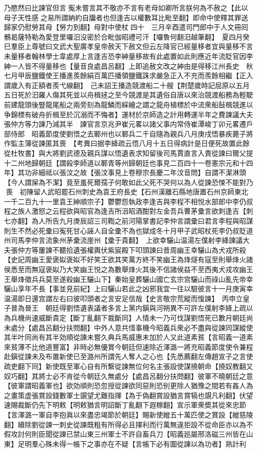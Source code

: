 乃愍然曰比諫官但言寃未嘗言其不敬亦不言有老母如卿所言朕何為不赦之【此以母子天性感之易所謂納約自牖者也但逢吉以權數耳比毗至翻】即命中使釋其罪送歸家仍慰勞其母【勞力到翻】母對中使杖四十　三月辛酉遣司門郎中于人文冊囘鶻曷薩特勒為愛登里囉汨没密於合毗伽昭禮可汗【囉魯何翻汨越筆翻】　夏四月癸巳羣臣上尊號曰文武大聖廣孝皇帝赦天下赦文但云左降官已經量移者宜與量移不言未量移者翰林學士韋處厚上言逢吉恐李紳量移故有此處置如此則應近年流貶官因李紳一人皆不得量移也【量音良處昌呂翻】上即追赦文改之紳由是得移江州長史　秋七月甲辰鹽鐵使王播進羨餘絹百萬匹播領鹽鐵誅求嚴急正入不充而羨餘相繼【正入謂歲入有正額者羨弋線翻】　己未詔王播造競渡船二十艘【荆楚歲時記屈原以五月五日死於汨羅人傷其死並以舟楫拯之至今競渡是其遺俗自唐以來治競渡船務為輕駛前建龍頭後豎龍尾船之兩旁刻為龍鱗而綵繪之謂之龍舟植標於中流衆船鼔楫競進以争錦標有破舟折楫至於沉溺而不悔者】運材於京師造之計用轉運半年之費諫議大夫張仲方等力諫乃減其半　諫官言京兆尹崔元畧以諸父事内常侍崔潭峻丁卯元畧遷戶部侍郎　昭義節度使劉悟之去鄆州也以鄆兵二千自隨為親兵八月庚戌悟暴疾薨子將作監主簿從諫匿其喪　【考異曰据李絳疏云悟八月十五日得病計是日便死故置此餘從杜牧書】與大將劉武德及親兵謀以悟遺表求知留後司馬賈直言入責從諫曰爾父提十二州地歸朝廷【謂殺李師道以鄆青等州歸朝廷也事見二百四十一卷憲宗元和十四年】其功非細祗以張汶之故【張汶事見上卷穆宗長慶二年汶音問】自謂不潔淋頭【今人謂屎為不潔】竟至羞死爾孺子何敢如此父死不哭何以為人從諫恐悚不能對乃喪　初陳留人武昭罷石州刺史為袁王府長史【石州漢離石縣地唐置石州京師東北一千二百九十一里袁王紳順宗子】鬱鬱怨執政李逢吉與李程不相悦水部郎中李仍叔程之族人激怒之云程欲與昭官為逢吉所沮昭酒酣對左金吾兵曹茅彚言欲刺逢吉【刺七亦翻】為人所告九月庚辰詔三司鞫之前河陽掌書記李仲言謂彚曰君言李程與昭謀則生不然必死彚曰寃死甘心誣人自全彚不為也獄成冬十月甲子武昭杖死李仍叔貶道州司馬李仲言流象州茅彚流崖州【彚于貴翻】　上欲幸驪山温湯左僕射李絳諫議大夫張仲方等屢諫不聽拾遺張權輿伏紫宸殿下叩頭諫曰昔周幽王幸驪山為犬戎所殺【史記周幽王愛褒姒褒姒不好笑王欲其笑萬方終不笑幽王為烽燧有寇至則舉烽火諸侯悉至而無寇褒姒乃大笑幽王悦之為數舉烽火其後不信諸侯益不至西夷犬戎攻幽王王舉烽徵兵兵莫至遂殺幽王驪山下】秦始皇葬驪山國亡玄宗宫驪山而祿山亂先帝幸驪山享年不長【事並見前紀】上曰驪山若此之凶邪我宜一往以驗彼言十一月庚寅幸温湯即日還宫謂左右曰彼叩頭者之言安足信哉【史言敬宗荒縱而愎諫】　丙申立皇子普為晉王　朝廷得劉悟遺表議者多言上黨内鎭與河朔異不可許左僕射李絳上疏以為兵機尚速威斷貴定【斷丁亂翻下裁斷同】人情未一乃可伐謀劉悟死已數月朝廷尚未處分【處昌呂翻分扶問翻】中外人意共惜事機今昭義兵衆必不盡與從諫同謀縱使其半叶同尚有其半効順從諫未嘗久典兵馬威惠未加於人又此道素貧【言昭義一道素來貧薄不比他道豐富】非時必無優賞今朝廷但速除近澤潞一將充昭義節度使令兼程赴鎭從諫未及布置新使已至潞州所謂先人奪人之心也【先悉薦翻左傳趙宣子之言使疏吏翻下同】新使既至軍心自有所繫從諫無位何名主張設使謀撓朝命【撓奴教翻又奴巧翻】其將士必不肯從今朝廷久無處分【處昌呂翻分扶問翻】彼軍不曉朝廷之意【彼軍謂昭義軍也】欲効順則恐忽授從諫欲同惡則恐别更除人猶豫之間若有姦人為之畫策虚張賞設錢數軍士覬望尤難指揮【為于偽翻賞設猶言賞犒也覬凡利翻】伏望速賜裁斷仍先下明敕【明敕猶言明詔斷丁亂翻下遐稼翻】宣示軍衆奬其從來忠節【言澤潞一軍自李抱眞以來盡忠竭節於朝廷】賜新使繒五十萬匹使之賞設【繒慈陵翻】續除劉從諫一刺史從諫既粗有所得必且擇利而行萬無違拒設不從命臣亦以為不假攻討何則臣聞從諫已禁山東三州軍士不許自畜兵刀【昭義廵屬邢洛磁三州皆在山東】足明羣心殊未得一帳下之事亦在不疑【言帳下必有圖從諫以為功者】熟計利